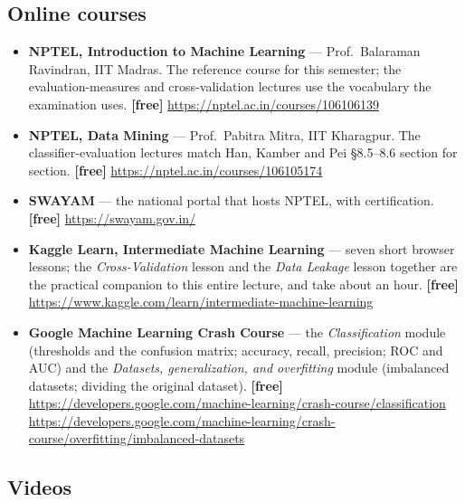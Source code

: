 \documentclass[11pt]{article}
\begin{document}
\subsection*{Online courses}

\begin{sloppypar}
\begin{itemize}[leftmargin=*]
  \item \textbf{NPTEL, Introduction to Machine Learning} --- Prof.\ Balaraman
    Ravindran, IIT Madras. The reference course for this semester; the
    evaluation-measures and cross-validation lectures use the vocabulary the
    examination uses. \textbf{[free]}
    \url{https://nptel.ac.in/courses/106106139}
  \item \textbf{NPTEL, Data Mining} --- Prof.\ Pabitra Mitra, IIT Kharagpur.
    The classifier-evaluation lectures match Han, Kamber and Pei
    \S8.5--8.6 section for section. \textbf{[free]}
    \url{https://nptel.ac.in/courses/106105174}
  \item \textbf{SWAYAM} --- the national portal that hosts NPTEL, with
    certification. \textbf{[free]} \url{https://swayam.gov.in/}
  \item \textbf{Kaggle Learn, Intermediate Machine Learning} --- seven short
    browser lessons; the \emph{Cross-Validation} lesson and the \emph{Data
    Leakage} lesson together are the practical companion to this entire
    lecture, and take about an hour. \textbf{[free]}
    \url{https://www.kaggle.com/learn/intermediate-machine-learning}
  \item \textbf{Google Machine Learning Crash Course} --- the
    \emph{Classification} module (thresholds and the confusion matrix;
    accuracy, recall, precision; ROC and AUC) and the \emph{Datasets,
    generalization, and overfitting} module (imbalanced datasets; dividing the
    original dataset). \textbf{[free]}
    \url{https://developers.google.com/machine-learning/crash-course/classification}
    \\
    \url{https://developers.google.com/machine-learning/crash-course/overfitting/imbalanced-datasets}
\end{itemize}
\end{sloppypar}

\subsection*{Videos}
\end{document}

